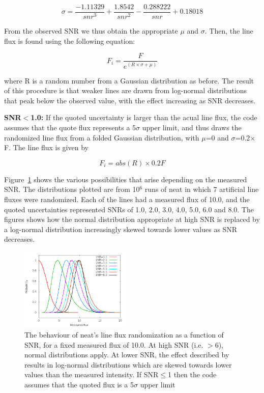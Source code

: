 \documentclass[useAMS,usenatbib]{mn2e}
\begin{document}
\begin{equation}
\sigma = \frac{-1.11329}{snr^3} + \frac{1.8542}{snr^2} - \frac{0.288222}{snr} + 0.18018
\end{equation}

From the observed SNR we thus obtain the appropriate $\mu$ and $\sigma$.  Then, the line flux is found using the following equation:

\begin{equation}
F_i = \frac{F}{e^{(R\times\sigma + \mu)}}
\end{equation}

where R is a random number from a Gaussian distribution as before.  The result of this procedure is that weaker lines are drawn from log-normal distributions that peak below the observed value, with the effect increasing as SNR decreases.

{\bf SNR$<$1.0: } If the quoted uncertainty is larger than the acual line flux, the code assumes that the quote flux represents a 5$\sigma$ upper limit, and thus draws the randomized line flux from a folded Gaussian distribution, with $\mu$=0 and $\sigma$=0.2$\times$F.  The line flux is given by

\begin{equation}
F_i = abs(R)\times0.2F
\end{equation}

Figure~\ref{distributions} shows the various possibilities that arise depending on the measured SNR.  The distributions plotted are from 10$^6$ runs of {\sc neat} in which 7 artificial line fluxes were randomized.  Each of the lines had a measured flux of 10.0, and the quoted uncertainties represented SNRs of 1.0, 2.0, 3.0, 4.0, 5.0, 6.0 and 8.0.  The figures shows how the normal distribution appropriate at high SNR is replaced by a log-normal distribution increasingly skewed towards lower values as SNR decreases.

\begin{figure}
\includegraphics[width=0.47\textwidth]{figures/distributions_2.png}
\caption{The behaviour of {\sc neat}'s line flux randomization as a function of SNR, for a fixed measured flux of 10.0.  At high SNR (i.e. $>$6), normal distributions apply.  At lower SNR, the effect described by \citet{1994A&A...287..676R} results in log-normal distributions which are skewed towards lower values than the measured intensity.  If SNR$\leq$1 then the code assumes that the quoted flux is a 5$\sigma$ upper limit}
\label{distributions}
\end{figure}
\end{document}

